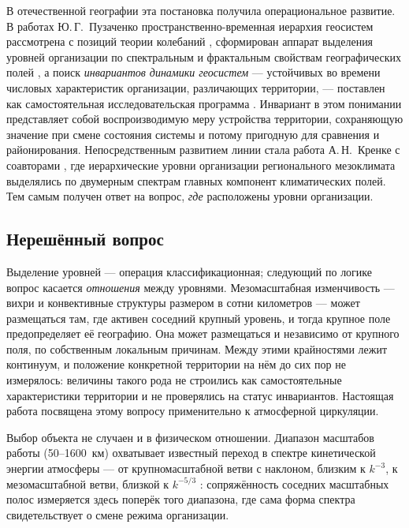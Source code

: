 \documentclass[11pt,a4paper]{article}
\begin{document}
В отечественной географии эта постановка получила операциональное развитие. В работах Ю.\,Г.~Пузаченко пространственно-временная иерархия геосистем рассмотрена с позиций теории колебаний \cite{Puzachenko1986}, сформирован аппарат выделения уровней организации по спектральным и фрактальным свойствам географических полей \cite{Puzachenko2004}, а поиск \emph{инвариантов динамики геосистем} --- устойчивых во времени числовых характеристик организации, различающих территории, --- поставлен как самостоятельная исследовательская программа \cite{Puzachenko2010}. Инвариант в этом понимании представляет собой воспроизводимую меру устройства территории, сохраняющую значение при смене состояния системы и потому пригодную для сравнения и районирования. Непосредственным развитием линии стала работа А.\,Н.~Кренке с соавторами \cite{Krenke2019}, где иерархические уровни организации регионального мезоклимата выделялись по двумерным спектрам главных компонент климатических полей. Тем самым получен ответ на вопрос, \emph{где} расположены уровни организации.

\subsection{Нерешённый вопрос}

Выделение уровней --- операция классификационная; следующий по логике вопрос касается \emph{отношения} между уровнями. Мезомасштабная изменчивость --- вихри и конвективные структуры размером в сотни километров --- может размещаться там, где активен соседний крупный уровень, и тогда крупное поле предопределяет её географию. Она может размещаться и независимо от крупного поля, по собственным локальным причинам. Между этими крайностями лежит континуум, и положение конкретной территории на нём до сих пор не измерялось: величины такого рода не строились как самостоятельные характеристики территории и не проверялись на статус инвариантов. Настоящая работа посвящена этому вопросу применительно к атмосферной циркуляции.

Выбор объекта не случаен и в физическом отношении. Диапазон масштабов работы (50--1600~км) охватывает известный переход в спектре кинетической энергии атмосферы --- от крупномасштабной ветви с наклоном, близким к $k^{-3}$, к мезомасштабной ветви, близкой к $k^{-5/3}$ \cite{NastromGage1985}: сопряжённость соседних масштабных полос измеряется здесь поперёк того диапазона, где сама форма спектра свидетельствует о смене режима организации.
\end{document}
